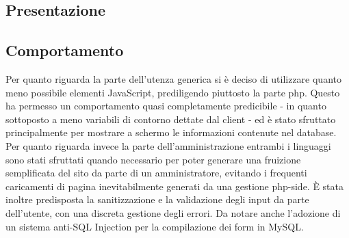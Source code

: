 \subsection{Presentazione}

\subsection{Comportamento}

Per quanto riguarda la parte dell'utenza generica si è deciso di utilizzare quanto meno possibile elementi JavaScript, prediligendo piuttosto la parte php. Questo ha permesso un comportamento quasi completamente predicibile - in quanto sottoposto a meno variabili di contorno dettate dal client - ed è stato sfruttato principalmente per mostrare a schermo le informazioni contenute nel database.
\\Per quanto riguarda invece la parte dell'amministrazione entrambi i linguaggi sono stati sfruttati quando necessario per poter generare una fruizione semplificata del sito da parte di un amministratore, evitando i frequenti caricamenti di pagina inevitabilmente generati da una gestione php-side. È stata inoltre predisposta la sanitizzazione e la validazione degli input da parte dell'utente, con una discreta gestione degli errori. Da notare anche l'adozione di un sistema anti-SQL Injection per la compilazione dei form in MySQL.

